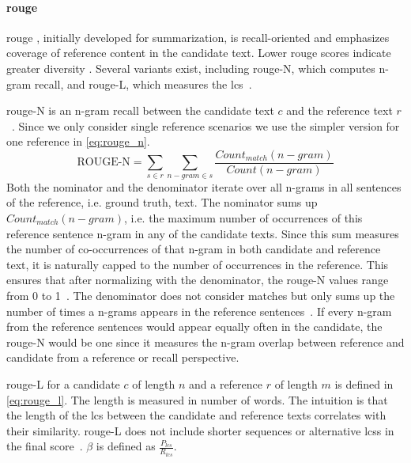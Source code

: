 
\paragraph{\ac{rouge}}
\ac{rouge} \citep{lin_rouge_2004}, initially developed for summarization, is recall-oriented and emphasizes coverage of reference content in the candidate text. 
Lower \ac{rouge} scores indicate greater diversity \citep{kurt_pehlivanoglu_comparative_2024}.
Several variants exist, including \ac{rouge}-N, which computes n-gram recall, and \ac{rouge}-L, which measures the \ac{lcs}~\citep{zhou_paraphrase_2021,palivela_optimization_2021,kurt_pehlivanoglu_comparative_2024}. 

\ac{rouge}-N is an n-gram recall between the candidate text $c$ and the reference text $r$~\citep{lin_rouge_2004}.
Since we only consider single reference scenarios we use the simpler version for one reference in \autoref{eq:rouge_n}.
\begin{equation}
    \text{ROUGE-N} = \sum_{s \in r}\sum_{n-gram \in s} \frac{Count_{match}(n-gram)}{Count(n-gram)}
\label{eq:rouge_n}
\end{equation}
Both the nominator and the denominator iterate over all n-grams in all sentences of the reference, i.e. ground truth, text.
The nominator sums up $Count_{match}(n-gram)$, i.e. the maximum number of occurrences of this reference sentence n-gram in any of the candidate texts.
Since this sum measures the number of co-occurrences of that n-gram in both candidate and reference text, it is naturally capped to the number of occurrences in the reference.
This ensures that after normalizing with the denominator, the \ac{rouge}-N values range from 0 to 1~\citep{kurt_pehlivanoglu_comparative_2024}.
The denominator does not consider matches but only sums up the number of times a n-grams appears in the reference sentences~\citep{lin_rouge_2004}.
If every n-gram from the reference sentences would appear equally often in the candidate, the \ac{rouge}-N would be one since it measures the n-gram overlap between reference and candidate from a reference or recall perspective.

\ac{rouge}-L for a candidate $c$ of length $n$ and a reference $r$ of length $m$ is defined in \autoref{eq:rouge_l}.
The length is measured in number of words.
The intuition is that the length of the \ac{lcs} between the candidate and reference texts correlates with their similarity.
\ac{rouge}-L does not include shorter sequences or alternative \acp{lcs} in the final score~\citep{lin_rouge_2004}.
$\beta$ is defined as $\frac{P_{lcs}}{R_{lcs}}$.

